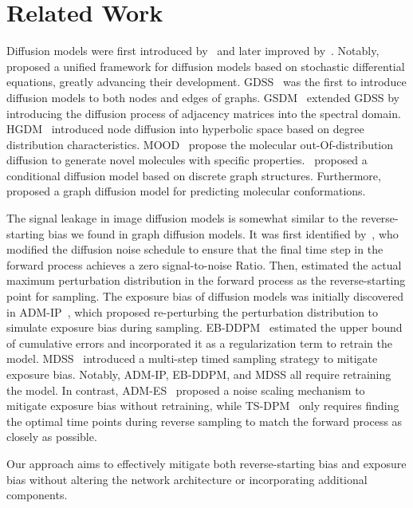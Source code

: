 \documentclass{article}
\begin{document}
\section{Related Work}
Diffusion models were first introduced by~\citet{sohl2015deep} and later improved by~\citet{ho2020denoising}. Notably, \citet{song2021scorebased} proposed a unified framework for diffusion models based on stochastic differential equations, greatly advancing their development. GDSS~\citep{jo2022GDSS} was the first to introduce diffusion models to both nodes and edges of graphs. GSDM~\citep{luo2023fast} extended GDSS by introducing the diffusion process of adjacency matrices into the spectral domain. HGDM~\citep{wen2024hyperbolic} introduced node diffusion into hyperbolic space based on degree distribution characteristics. MOOD~\citep{lee2023exploring} propose the molecular out-Of-distribution diffusion to generate novel molecules with specific properties.~\citet{huang2023conditional} proposed a conditional diffusion model based on discrete graph structures. Furthermore,~\citet{Xu2022GeoDiff} proposed a graph diffusion model for predicting molecular conformations.

The signal leakage in image diffusion models is somewhat similar to the reverse-starting bias we found in graph diffusion models. It was first identified by~\citet{lin2024common}, who modified the diffusion noise schedule to ensure that the final time step in the forward process achieves a zero signal-to-noise Ratio. Then, \citet{everaert2024exploiting} estimated the actual maximum perturbation distribution in the forward process as the reverse-starting point for sampling. The exposure bias of diffusion models was initially discovered in ADM-IP~\citep{ning2023input}, which proposed re-perturbing the perturbation distribution to simulate exposure bias during sampling. EB-DDPM~\citep{li2023error} estimated the upper bound of cumulative errors and incorporated it as a regularization term to retrain the model. MDSS~\citep{ren2024multi} introduced a multi-step timed sampling strategy to mitigate exposure bias. Notably, ADM-IP, EB-DDPM, and MDSS all require retraining the model. In contrast, ADM-ES~\citep{ningelucidating} proposed a noise scaling mechanism to mitigate exposure bias without retraining, while TS-DPM~\citep{li2024alleviating} only requires finding the optimal time points during reverse sampling to match the forward process as closely as possible.

Our approach aims to effectively mitigate both reverse-starting bias and exposure bias without altering the network architecture or incorporating additional components.
\end{document}

